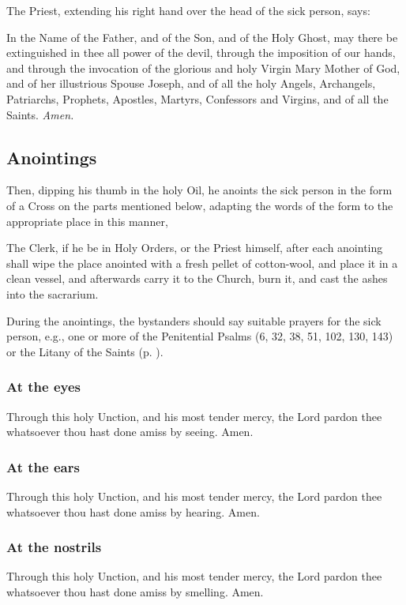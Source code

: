 \begin{rubric}
    The Priest, extending his right hand over the head of the sick person, says:
\end{rubric}\par\noindent
In the Name of the {} Father, and of the {} Son, and of the {} Holy Ghost, may there be extinguished in thee all power of the devil, through the imposition of our hands, and through the invocation of the glorious and holy Virgin Mary Mother of God, and of her illustrious Spouse Joseph, and of all the holy Angels, Archangels, Patriarchs, Prophets, Apostles, Martyrs, Confessors and Virgins, and of all the Saints. \textit{Amen.}
\subsection{Anointings}
\begin{rubric}
    Then, dipping his thumb in the holy Oil, he anoints the sick person in the form of a Cross on the parts mentioned below, adapting the words of the form to the appropriate place in this manner,
\end{rubric}
\begin{rubric}
    The Clerk, if he be in Holy Orders, or the Priest himself, after each anointing shall wipe the place anointed with a fresh pellet of cotton-wool, and place it in a clean vessel, and afterwards carry it to the Church, burn it, and cast the ashes into the sacrarium.
\end{rubric}
\begin{rubric}
    During the anointings, the bystanders should say suitable prayers for the sick person, e.g., one or more of the Penitential Psalms (6, 32, 38, 51, 102, 130, 143) or the Litany of the Saints (p. \pageref{LitanySaints}).
\end{rubric}
\subsubsection{At the eyes}\noindent
Through this holy {} Unction, and his most tender mercy, the Lord pardon thee whatsoever thou hast done amiss by seeing. Amen.
\subsubsection{At the ears}\noindent
Through this holy {} Unction, and his most tender mercy, the Lord pardon thee whatsoever thou hast done amiss by hearing. Amen.
\subsubsection{At the nostrils}\noindent
Through this holy {} Unction, and his most tender mercy, the Lord pardon thee whatsoever thou hast done amiss by smelling. Amen.
